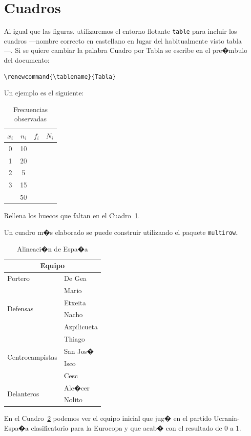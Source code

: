 \documentclass[a4paper,12pt,%
]{memoir}
\begin{document}
\section{Cuadros}
Al igual que las figuras, utilizaremos el entorno flotante
\texttt{table} para incluir los cuadros ---nombre correcto en
castellano en lugar del habitualmente visto tabla---. Si se quiere
cambiar la palabra Cuadro por Tabla se escribe en el pre�mbulo del
documento:
\begin{verbatim}
\renewcommand{\tablename}{Tabla}
\end{verbatim}
\par
Un ejemplo es el siguiente: 
\begin{table}[h]
  \centering
  \begin{tabular}{|c|ccc|}
    \hline
    $x_i$ & $n_i$ & $f_i$ & $N_i$ \\
    \hline \hline
    0 & 10 & & \\
    1 & 20 & & \\
    2 & 5 & & \\
    3 & 15 & & \\
    \hline
    \multicolumn{1}{c}{} & 50 & & \multicolumn{1}{c}{}\\
  \end{tabular}
  \caption{Frecuencias observadas}
  \label{tab:t1}
\end{table}
\par
Rellena los huecos que faltan en el Cuadro~\ref{tab:t1}.
\par
Un cuadro m�s elaborado se puede construir utilizando el paquete
\texttt{multirow}.
\begin{table}[h]
  \centering
  \begin{tabular}{|l|l|}
    \hline
    \multicolumn{2}{|c|}{Equipo} \\
    \hline
    Portero& De Gea \\ \hline
    \multirow{4}{*}{Defensas} & Mario \\
    & Etxeita\\
    & Nacho\\
    & Azpilicueta\\ \hline
    \multirow{4}{*}{Centrocampistas} & Thiago\\
    & San Jos� \\
    & Isco \\
    & Cesc \\\hline
    \multirow{2}{*}{Delanteros} & Alc�cer \\
    & Nolito \\
    \hline
  \end{tabular}
  \caption{Alineaci�n de Espa�a}
  \label{tab:alineacion}
\end{table}
\par
En el Cuadro~\ref{tab:alineacion} podemos ver el equipo inicial que
jug� en el partido Ucrania-Espa�a clasificatorio para la Eurocopa y
que acab� con el resultado de 0 a 1.
\end{document}

